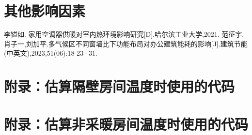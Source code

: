 \documentclass{article}
\begin{document}
\section{其他影响因素}



\begin{thebibliography}{99}  
李镒如. 家用空调器供暖对室内热环境影响研究[D].哈尔滨工业大学,2021.
范征宇,肖子一,刘加平.多气候区不同窗墙比下功能布局对办公建筑能耗的影响[J].建筑节能(中英文),2023,51(06):18-23+31.
\end{thebibliography}

\newpage
\begin{appendices}
    \section{附录：估算隔壁房间温度时使用的代码}

    
        
    \section{附录：估算非采暖房间温度时使用的代码}

    
\end{appendices}
\end{document}
